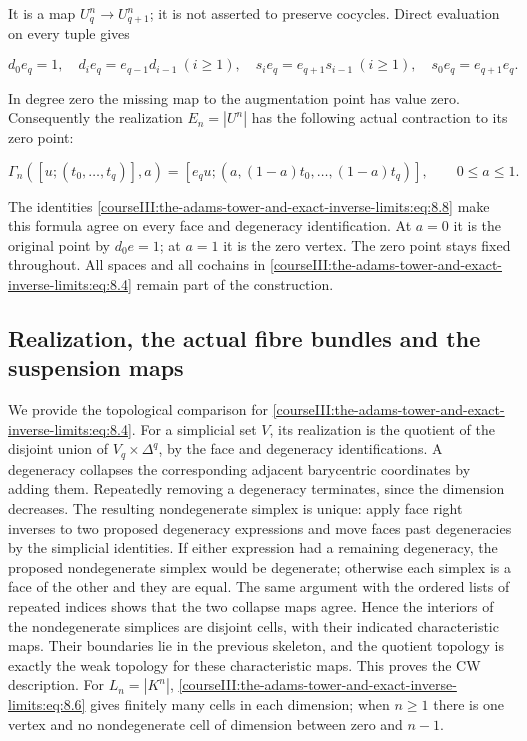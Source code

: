 It is a map \(U^n_q\to U^n_{q+1}\); it is not asserted to preserve cocycles. Direct evaluation on every tuple gives

\begin{equation}
d_0e_q=1,\quad d_i e_q=e_{q-1}d_{i-1}\ (i\geq1),\quad
 s_i e_q=e_{q+1}s_{i-1}\ (i\geq1),\quad
 s_0e_q=e_{q+1}e_q.
 \label{courseIII:the-adams-tower-and-exact-inverse-limits:eq:8.8}
\end{equation}

In degree zero the missing map to the augmentation point has value zero. Consequently the realization \(E_n=|U^n|\) has the following actual contraction to its zero point:

\begin{equation}
\Gamma_n([u;(t_0,\ldots,t_q)],a)
  =[e_qu;(a,(1-a)t_0,\ldots,(1-a)t_q)],
       \qquad 0\leq a\leq1.
 \label{courseIII:the-adams-tower-and-exact-inverse-limits:eq:8.9}
\end{equation}

The identities \eqref{courseIII:the-adams-tower-and-exact-inverse-limits:eq:8.8} make this formula agree on every face and degeneracy identification. At \(a=0\) it is the original point by \(d_0e=1\); at \(a=1\) it is the zero vertex. The zero point stays fixed throughout. All spaces and all cochains in \eqref{courseIII:the-adams-tower-and-exact-inverse-limits:eq:8.4} remain part of the construction.

\subsection{Realization, the actual fibre bundles and the suspension maps}
\label{courseIII:the-adams-tower-and-exact-inverse-limits:adams-original-spectrum}

\label{courseIII:the-adams-tower-and-exact-inverse-limits:section-9}\label{courseIII:adams-tower:9}

We provide the topological comparison for \eqref{courseIII:the-adams-tower-and-exact-inverse-limits:eq:8.4}. For a simplicial set \(V\), its realization is the quotient of the disjoint union of \(V_q\times\Delta^q\), by the face and degeneracy identifications. A degeneracy collapses the corresponding adjacent barycentric coordinates by adding them. Repeatedly removing a degeneracy terminates, since the dimension decreases. The resulting nondegenerate simplex is unique: apply face right inverses to two proposed degeneracy expressions and move faces past degeneracies by the simplicial identities. If either expression had a remaining degeneracy, the proposed nondegenerate simplex would be degenerate; otherwise each simplex is a face of the other and they are equal. The same argument with the ordered lists of repeated indices shows that the two collapse maps agree. Hence the interiors of the nondegenerate simplices are disjoint cells, with their indicated characteristic maps. Their boundaries lie in the previous skeleton, and the quotient topology is exactly the weak topology for these characteristic maps. This proves the CW description. For \(L_n=|K^n|\), \eqref{courseIII:the-adams-tower-and-exact-inverse-limits:eq:8.6} gives finitely many cells in each dimension; when \(n\geq1\) there is one vertex and no nondegenerate cell of dimension between zero and \(n-1\).

